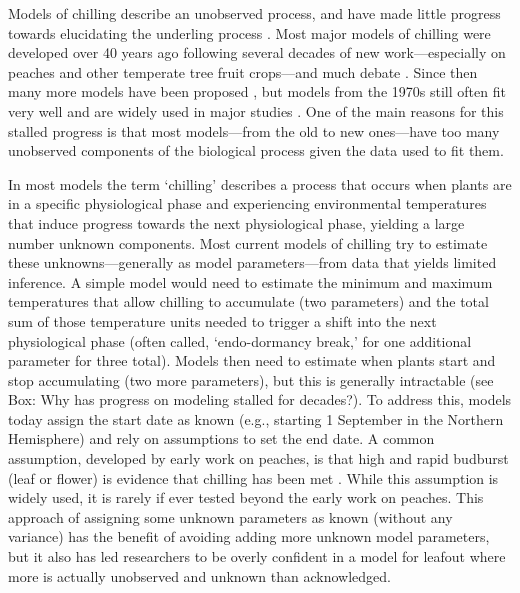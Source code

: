 \documentclass[11pt]{article}
\begin{document}
Models of chilling describe an unobserved process, and have made little progress towards elucidating the underling process \citep{chuine2016}. 
Most major models of chilling were developed over 40 years ago \citep{richardson1974} following several decades of new work---especially on peaches and other temperate tree fruit crops---and much debate \citep{dormtreeproc}. Since then many more models have been proposed \citep{luedeling2012chilling,chuine2016}, but models from the 1970s still often fit very well \citep{basler2016evaluating,chuine2016} and are widely used in major studies \citep[e.g.,][]{richardson1974,chuine2016,ospreebbms}. One of the main reasons for this stalled progress is that most models---from the old to new ones---have too many unobserved components of the biological process given the data used to fit them. 

In most models the term `chilling' describes a process that occurs when plants are in a specific physiological phase and experiencing environmental temperatures that induce progress towards the next physiological phase, yielding a large number unknown components. Most current models of chilling try to estimate these unknowns---generally as model parameters---from data that yields limited inference. A simple model would need to estimate the minimum and maximum temperatures that allow chilling to accumulate (two parameters) and the total sum of those temperature units needed to trigger a shift into the next physiological phase (often called, `endo-dormancy break,' for one additional parameter for three total). Models then need to estimate  when plants start and stop accumulating (two more parameters), but this is generally intractable  (see Box: Why has progress on modeling stalled for decades?). To address this, models today assign the start date as known (e.g., starting 1 September in the Northern Hemisphere) and rely on assumptions to set the end date. A common assumption, developed by early work on peaches, is that high and rapid budburst (leaf or flower) is evidence that chilling has been met \citep{erez1971}. While this assumption is widely used, it is rarely if ever tested beyond the early work on peaches. This approach of assigning some unknown parameters as known (without any variance) has the benefit of avoiding adding more unknown model parameters, but it also has led researchers to be overly confident in a model for leafout where more is actually unobserved and unknown than acknowledged. 
\end{document}
